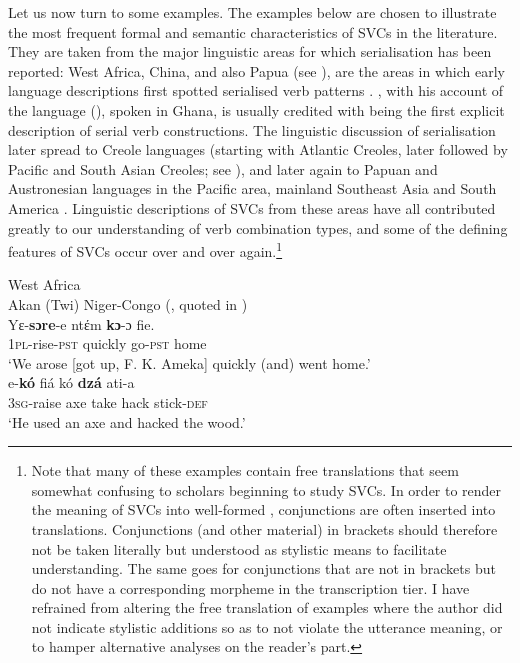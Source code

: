 Let us now turn to some examples. The examples below are chosen to illustrate the most frequent formal and semantic characteristics of SVCs in the literature. They are taken from the major linguistic areas for which serialisation has been reported: West Africa, China, and also Papua (see \citealt[2]{senft2008intro}), are the areas in which early language descriptions first spotted serialised verb patterns \citep{sebba1987syntax, Matthews2006}. \citet{christaller1875}, with his account of the  language (), spoken in Ghana, is usually credited with being the first explicit description of serial verb constructions. The linguistic discussion of serialisation later spread to Creole languages (starting with Atlantic Creoles, later followed by Pacific and South Asian Creoles; see \citealt{nordhoff2012}), and later again to Papuan and Austronesian languages in the Pacific area, mainland Southeast Asia and South America \citep{senft2008event}. Linguistic descriptions of SVCs from these areas have all contributed greatly to our understanding of verb combination types, and some of the defining features of SVCs occur over and over again.\footnote{Note that many of these examples contain free translations that seem somewhat confusing to scholars beginning to study SVCs. In order to render the meaning of SVCs into well-formed , conjunctions are often inserted into translations. Conjunctions (and other material) in brackets should therefore not be taken literally but understood as stylistic means to facilitate understanding. The same goes for conjunctions that are not in brackets but do not have a corresponding morpheme in the transcription tier. I have refrained from altering the free translation of examples where the author did not indicate stylistic additions so as to not violate the utterance meaning, or to hamper alternative analyses on the reader's part.}

\ea \label{Twi0001} 
West Africa\\
\ea \label{Twi01}
{Akan (Twi)} {Niger-Congo} ({\citealt{christaller1875}, quoted in \citealt[21]{ameka2005multiverb}})\\
\gll Yε-\textbf{sɔre}-e ntέm \textbf{kɔ}-ɔ  fie.\\
\textsc{1}\textsc{pl}-rise-\textsc{pst} quickly go-\textsc{pst} home\\
\glt ‘We arose [got up, F. K. Ameka] quickly (and) went home.’
\ex \label{Ewe01}
\\
\gll e-\textbf{kó} fiá kó \textbf{dzá} ati-a \\
\textsc{3}\textsc{sg}-raise axe take hack stick-\textsc{def}\\
\glt ‘He used an axe and hacked the wood.’
\z
\z

